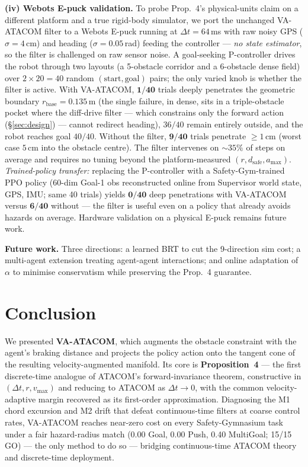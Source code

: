 \documentclass[letterpaper]{article}
\begin{document}
\textbf{(iv) Webots E-puck validation.} To probe Prop.~4's physical-units claim on a different platform and a true rigid-body simulator, we port the unchanged VA-ATACOM filter to a Webots E-puck running at $\Delta t{=}64$\,ms with raw noisy GPS ($\sigma{=}4$\,cm) and heading ($\sigma{=}0.05$\,rad) feeding the controller --- \emph{no state estimator}, so the filter is challenged on raw sensor noise. A goal-seeking P-controller drives the robot through two layouts (a 5-obstacle corridor and a 6-obstacle dense field) over $2{\times}20{=}40$ random $(\text{start},\text{goal})$ pairs; the only varied knob is whether the filter is active. With VA-ATACOM, $\mathbf{1/40}$ trials deeply penetrates the geometric boundary $r_\text{base}{=}0.135$\,m (the single failure, in dense, sits in a triple-obstacle pocket where the diff-drive filter --- which constrains only the forward action (\S\ref{sec:design}) --- cannot redirect heading), $36/40$ remain entirely outside, and the robot reaches goal $40/40$. Without the filter, $\mathbf{9/40}$ trials penetrate $\ge\!1$\,cm (worst case $5$\,cm into the obstacle centre). The filter intervenes on ${\sim}35\%$ of steps on average and requires no tuning beyond the platform-measured $(r, d_\text{safe}, a_{\max})$. \emph{Trained-policy transfer:} replacing the P-controller with a Safety-Gym-trained PPO policy (60-dim Goal-1 obs reconstructed online from Supervisor world state, GPS, IMU; same 40 trials) yields $\mathbf{0/40}$ deep penetrations with VA-ATACOM versus $\mathbf{6/40}$ without --- the filter is useful even on a policy that already avoids hazards on average. Hardware validation on a physical E-puck remains future work.

\textbf{Future work.} Three directions: a learned BRT to cut the 9-direction sim cost; a multi-agent extension treating agent-agent interactions; and online adaptation of $\alpha$ to minimise conservatism while preserving the Prop.~4 guarantee.

\section{Conclusion}

We presented \textbf{VA-ATACOM}, which augments the obstacle constraint with the agent's braking distance and projects the policy action onto the tangent cone of the resulting velocity-augmented manifold. Its core is \textbf{Proposition~4} --- the first discrete-time analogue of ATACOM's forward-invariance theorem, constructive in $(\Delta t, r, v_{\max})$ and reducing to ATACOM as $\Delta t\to0$, with the common velocity-adaptive margin recovered as its first-order approximation. Diagnosing the M1 chord excursion and M2 drift that defeat continuous-time filters at coarse control rates, VA-ATACOM reaches near-zero cost on every Safety-Gymnasium task under a fair hazard-radius match (0.00 Goal, 0.00 Push, 0.40 MultiGoal; 15/15 GO) --- the only method to do so --- bridging continuous-time ATACOM theory and discrete-time deployment.
\end{document}
